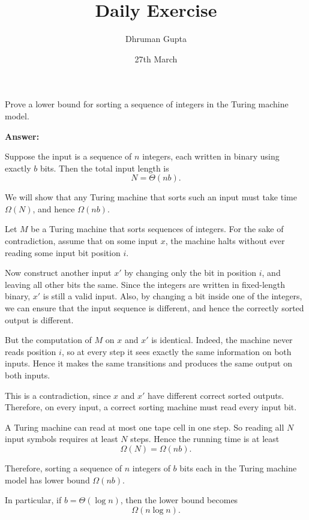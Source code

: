 \documentclass[11pt]{article}
\title{Daily Exercise}
\author{Dhruman Gupta}
\date{27th March}
\begin{document}

Prove a lower bound for sorting a sequence of integers in the Turing machine model.

\textbf{Answer:}

Suppose the input is a sequence of $n$ integers, each written in binary using exactly $b$ bits. Then the total input length is
\[
N = \Theta(nb).
\]

We will show that any Turing machine that sorts such an input must take time $\Omega(N)$, and hence $\Omega(nb)$.

Let $M$ be a Turing machine that sorts sequences of integers. For the sake of contradiction, assume that on some input $x$, the machine halts without ever reading some input bit position $i$.

Now construct another input $x'$ by changing only the bit in position $i$, and leaving all other bits the same. Since the integers are written in fixed-length binary, $x'$ is still a valid input. Also, by changing a bit inside one of the integers, we can ensure that the input sequence is different, and hence the correctly sorted output is different.

But the computation of $M$ on $x$ and $x'$ is identical. Indeed, the machine never reads position $i$, so at every step it sees exactly the same information on both inputs. Hence it makes the same transitions and produces the same output on both inputs.

This is a contradiction, since $x$ and $x'$ have different correct sorted outputs. Therefore, on every input, a correct sorting machine must read every input bit.

A Turing machine can read at most one tape cell in one step. So reading all $N$ input symbols requires at least $N$ steps. Hence the running time is at least
\[
\Omega(N) = \Omega(nb).
\]

Therefore, sorting a sequence of $n$ integers of $b$ bits each in the Turing machine model has lower bound $\Omega(nb)$.

In particular, if $b = \Theta(\log n)$, then the lower bound becomes
\[
\Omega(n \log n).
\]
\end{document}

